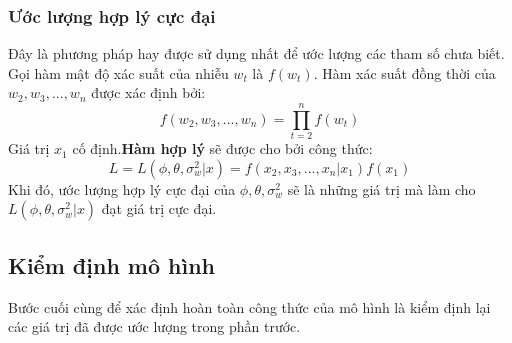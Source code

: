 \documentclass[twoside,12pt]{Latex/Classes/PhDthesisPSnPDF}
\begin{document}
\subsubsection{Ước lượng hợp lý cực đại}
Đây là phương pháp hay được sử dụng nhất để ước lượng các tham số chưa biết.
Gọi hàm mật độ xác suất của nhiễu $w_t$ là $f(w_t)$. Hàm xác suất đồng thời của $w_2,w_3,...,w_n$ được xác định bởi:
\begin{equation}
	f(w_2,w_3,...,w_n) = \prod^{n}_{t=2} f(w_t)
\end{equation}
Giá trị $x_1$ cố định.\textbf{Hàm hợp lý} sẽ được cho bởi công thức:
\begin{equation}
	L= L(\phi,\theta,\sigma^{2}_{w}|x) = f(x_2,x_3,...,x_n|x_1) f(x_1)
\end{equation}
Khi đó, ước lượng hợp lý cực đại của $\phi,\theta,\sigma^{2}_{w}$ sẽ là những giá trị mà làm cho $L(\phi,\theta,\sigma^{2}_{w}|x)$ đạt giá trị cực đại.


\subsection{Kiểm định mô hình}
Bước cuối cùng để xác định hoàn toàn công thức của mô hình là kiểm định lại các giá trị đã được ước lượng trong phần trước.
\end{document}
